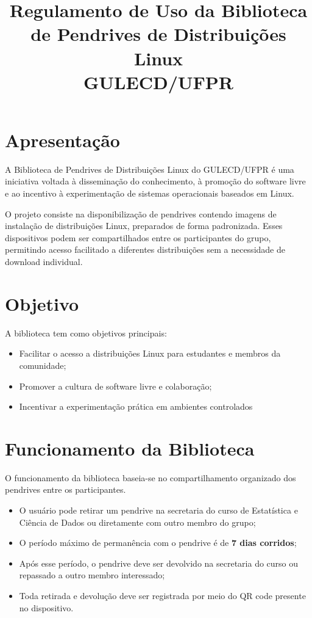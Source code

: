 \documentclass[12pt,a4paper]{article}
\title{\textbf{Regulamento de Uso da Biblioteca de Pendrives de Distribuições Linux}\\
GULECD/UFPR}
\author{}
\date{}
\begin{document}
\maketitle

\section{Apresentação}

A Biblioteca de Pendrives de Distribuições Linux do GULECD/UFPR é uma iniciativa voltada à disseminação do conhecimento,
 à promoção do software livre e ao incentivo à experimentação de sistemas operacionais baseados em Linux.

O projeto consiste na disponibilização de pendrives contendo imagens de instalação de distribuições Linux, preparados de forma padronizada. 
Esses dispositivos podem ser compartilhados entre os participantes do grupo, permitindo
  acesso facilitado a diferentes distribuições sem a necessidade de download individual.

\section{Objetivo}

A biblioteca tem como objetivos principais:

\begin{itemize}
    \item Facilitar o acesso a distribuições Linux para estudantes e membros da comunidade;
    \item Promover a cultura de software livre e colaboração;
    \item Incentivar a experimentação prática em ambientes controlados
\end{itemize}

\section{Funcionamento da Biblioteca}

O funcionamento da biblioteca baseia-se no compartilhamento organizado dos pendrives entre os participantes.

\begin{itemize}
    \item O usuário pode retirar um pendrive na secretaria do curso de Estatística e Ciência de Dados ou diretamente com outro membro do grupo;
    \item O período máximo de permanência com o pendrive é de \textbf{7 dias corridos};
    \item Após esse período, o pendrive deve ser devolvido na secretaria do curso ou repassado a outro membro interessado;
    \item Toda retirada e devolução deve ser registrada por meio do QR code presente no dispositivo.
\end{itemize}
\end{document}
